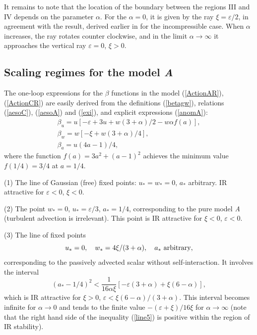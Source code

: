 \documentclass[12pt]{article}
\begin{document}
It remains to note that the location of the boundary between the regions
III and IV depends on the parameter $\alpha$. For the $\alpha=0$, it is
given by the ray $\xi=\varepsilon/2$, in agreement with the result, derived
earlier in \cite{AIK} for the incompressible case. When $\alpha$ increases,
the ray rotates counter clockwise, and in the limit $\alpha\to\infty$ it
approaches the vertical ray $\varepsilon=0$, $\xi>0$.


\subsection{Scaling regimes for the model {\it A}} \label{sec:GPA}

The one-loop expressions for the $\beta$ functions in the model
(\ref{ActionAR}), (\ref{ActionCR}) are easily derived from the definitions
(\ref{betagw}), relations (\ref{aesoC}), (\ref{aesoA}) and (\ref{exi}),
and explicit expressions (\ref{anomA}):
\begin{eqnarray}
\beta_{u} = u \left[ -\varepsilon+ 3u + w(3+\alpha)/2 -w\alpha f(a) \right],
\nonumber \\
\beta_{w} = w \left[ -\xi + w(3+\alpha)/4 \right],
\nonumber \\
\beta_{a} = u(4a-1)/4,
\label{betaA}
\end{eqnarray}
where the function $f(a)=3a^{2}+(a-1)^{2}$ achieves the minimum value
$f(1/4) =3/4$ at $a=1/4$.


(1) The line of Gaussian (free) fixed points: $u_{*}=w_{*}=0$, $a_{*}$
arbitrary. IR attractive for $\varepsilon<0$, $\xi<0$.

(2) The point $w_{*}=0$, $u_{*}=\varepsilon/3$, $a_{*}=1/4$, corresponding
to the pure model {\it A} (turbulent advection is irrelevant). This point
is IR attractive for $\xi<0$, $\varepsilon<0$.

(3) The line of fixed points
\begin{equation}
u_{*}=0, \quad w_{*}=4\xi/(3+\alpha), \quad  a_{*} \ {\rm arbitrary},
\label{line4}
\end{equation}
corresponding to the passively advected scalar without self-interaction.
It involves the interval
\begin{equation}
(a_{*}-1/4)^{2} < \frac{1}{16\alpha\xi} \left[ -\varepsilon(3+\alpha) +
\xi(6-\alpha)  \right],
\label{line5}
\end{equation}
which is IR attractive for $\xi>0$, $\varepsilon< \xi (6-\alpha)/(3+\alpha)$.
This interval becomes infinite for $\alpha\to0$ and tends to the finite
value $-(\varepsilon+\xi)/16\xi$ for $\alpha\to\infty$ (note that the right hand
side of the inequality (\ref{line5}) is positive within the region of
IR stability).
\end{document}
